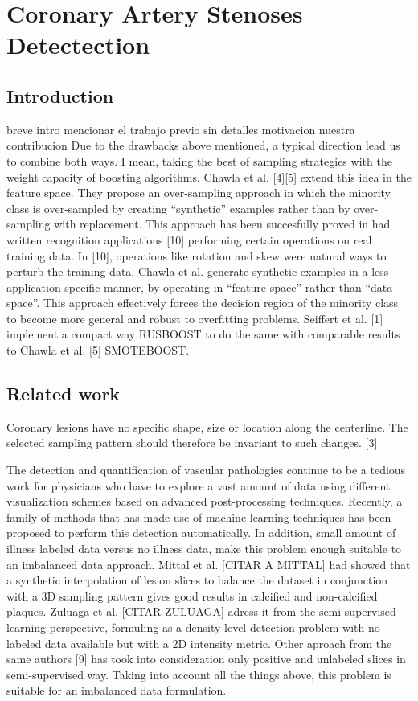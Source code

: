 \chapter{Coronary Artery Stenoses Detectection}
%

\section{Introduction}

breve intro
mencionar el trabajo previo sin detalles
motivacion
nuestra contribucion
Due to the drawbacks above mentioned, a typical direction lead us to combine both ways. I mean, taking the best of sampling strategies with the weight capacity of boosting algorithms. Chawla et al. [4][5] extend this idea in the feature space. They propose an over-sampling approach in which the minority class is over-sampled by creating “synthetic” examples rather than by over-sampling with replacement. This approach has been succesfully proved in had written recognition applications [10] performing certain operations on real training data. In [10], operations like rotation and skew were natural ways to perturb the training data. Chawla et al. generate synthetic examples in a less application-specific manner, by operating in “feature space” rather than “data space”. This approach effectively forces the decision region of the minority class to become more general and robust to overfitting problems. Seiffert et al. [1] implement a compact way RUSBOOST to do the same with comparable results to Chawla et al. [5] SMOTEBOOST.

\section{Related work}

Coronary lesions have no specific shape, size or location along the centerline. The selected sampling pattern should therefore be invariant to such changes. [3]

The detection and quantification of vascular pathologies continue to be a tedious work for physicians who have to explore a vast amount of data using different visualization schemes based on advanced post-processing techniques. Recently, a family of methods that has made use of machine learning techniques has been proposed to perform this detection automatically. In addition, small amount of illness labeled data versus no illness data, make this problem enough suitable to an imbalanced data approach. Mittal et al. [CITAR A MITTAL] had showed that a synthetic interpolation of lesion slices to balance the dataset in conjunction with a 3D sampling pattern gives good results in calcified and non-calcified plaques. Zuluaga et al. [CITAR ZULUAGA] adress it from the semi-supervised learning perspective, formuling as a density level detection problem with no labeled data available but with a 2D intensity metric. Other aproach from the same authors [9] has took into consideration only positive and unlabeled slices in semi-supervised way. Taking into account all the things above, this problem is suitable for an imbalanced data formulation.



